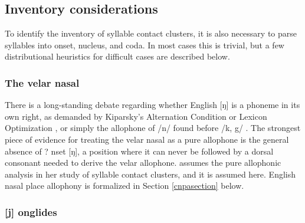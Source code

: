 \subsection{Inventory considerations}

To identify the inventory of syllable contact clusters, it is also necessary to parse syllables into onset, nucleus, and coda. In most cases this is trivial, but a few distributional heuristics for difficult cases are described below.

\subsubsection{The velar nasal}
\label{velarnasal}

There is a long-standing debate regarding whether English [ŋ] is a phoneme in its own right, as demanded by Kiparsky's Alternation Condition \citep{Kiparsky1968} or Lexicon Optimization \citep[][53]{OT}, or simply the allophone of /n/ found before /k, g/ \citep[][65]{Borowsky1986}. The strongest piece of evidence for treating the velar nasal as a pure allophone is the general absence of ?
nset [ŋ], a position where it can never be followed by a dorsal consonant needed to derive the velar allophone. \citet{Pierrehumbert1994} assumes the pure allophonic analysis in her study of syllable contact clusters, and it is assumed here. English nasal place allophony is formalized in Section \ref{cnpasection} below.

\subsubsection{[j] onglides}

